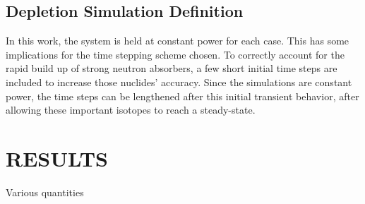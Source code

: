 \documentclass[letterpaper]{physor2024}
\begin{document}
\subsection{Depletion Simulation Definition}\label{sec:depl_sim}

In this work, the system is held at constant power for each case. This has some implications for the time stepping scheme chosen. To correctly account for the rapid build up of strong neutron absorbers, a few short initial time steps are included to increase those nuclides' accuracy. Since the simulations are constant power, the time steps can be lengthened after this initial transient behavior, after allowing these important isotopes to reach a steady-state.


\section{RESULTS}\label{sec:results}
Various quantities
\end{document}
